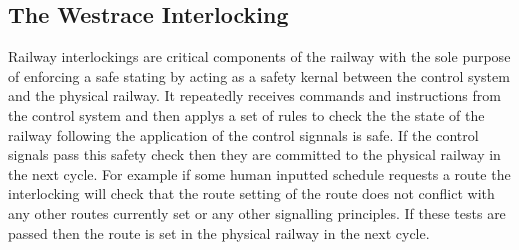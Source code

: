 \begin{comment}
The one aspect signal is typically a fixed red indicating that is not possible
to proceed down the track at this current point in time. The two - four aspect
signals are used on tracks with different speeds to convey different stopping
distances.  The two aspect signal for instance would be used on a low speed
track segment where stopping distances are relatively short. Whereas the four
aspect signal would be used on a high speed line where stopping distances are
long and the driver needs information for a greater length of track. These
signalling schemes are fixed in the UK however they are not fixed from country
to country. On the continent, for example, they may use different conventions,
colours and number of lights on each signal.
\end{comment}



\subsection{The Westrace Interlocking}

Railway interlockings are critical components of the railway with the sole purpose of enforcing a safe stating by acting as a safety kernal between the control system and the physical railway. It repeatedly receives commands and instructions from the control system and then applys a set of rules to check the the state of the railway following the application of the control signnals is safe. If the control signals pass this safety check then they are committed to the physical railway in the next cycle. For example if some human inputted schedule requests a route the interlocking will check that the route setting of the route does not conflict with any other routes currently set or any other signalling principles. If these tests are passed then the route  is set in the physical railway in the next cycle.

\begin{comment}
The railway interlocking is a key component in ensuring the safety of the
railway. Its job is to apply a set of rules to the requests and commands it receives from the
control system and check whether or not the future state of the railway is safe.
If the control signals it receives do not violate the safety of the railway
then these signals are committed to the physical infrastructure. For example if
the human controller requests for a route to be set the interlocking will
process this request and ensure that it does not conflict with other routes
before allowing the command to be passed to the physical railway.
\end{comment}


